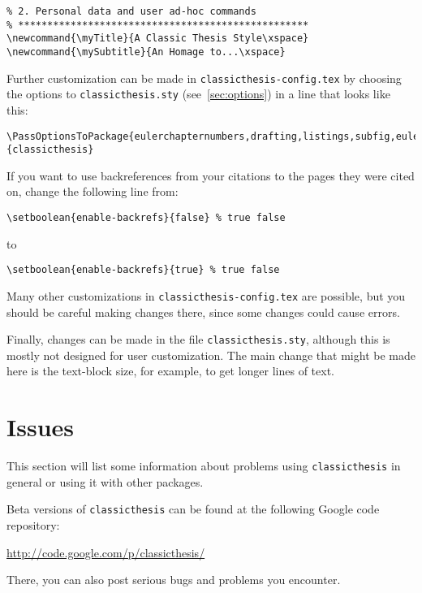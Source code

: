 \begin{lstlisting}[frame=lt]
% **************************************************
% 2. Personal data and user ad-hoc commands
% **************************************************
\newcommand{\myTitle}{A Classic Thesis Style\xspace}
\newcommand{\mySubtitle}{An Homage to...\xspace}
\end{lstlisting}

Further customization can be made in \texttt{classicthesis-config.tex}
by choosing the options to \texttt{classicthesis.sty}
(see~\autoref{sec:options}) in a line that looks like this:

\begin{lstlisting}[frame=lt]
\PassOptionsToPackage{eulerchapternumbers,drafting,listings,subfig,eulermath,parts}{classicthesis}
\end{lstlisting}

If you want to use backreferences from your citations to the pages
they were cited on, change the following line from:
\begin{lstlisting}[breaklines=false,frame=lt]
\setboolean{enable-backrefs}{false} % true false
\end{lstlisting}
to
\begin{lstlisting}[breaklines=false,frame=lt]
\setboolean{enable-backrefs}{true} % true false
\end{lstlisting}

Many other customizations in \texttt{classicthesis-config.tex} are
possible, but you should be careful making changes there, since some
changes could cause errors.

Finally, changes can be made in the file \texttt{classicthesis.sty},%
 although this is mostly not designed for user customization. The
main change that might be made here is the text-block size, for example,
to get longer lines of text.


\section{Issues}\label{sec:issues}
This section will list some information about problems using
\texttt{classic\-thesis} in general or using it with other packages.

Beta versions of \texttt{classicthesis} can be found at the following
Google code repository:
\begin{center}
    \url{http://code.google.com/p/classicthesis/}
\end{center}
There, you can also post serious bugs and problems you encounter.

